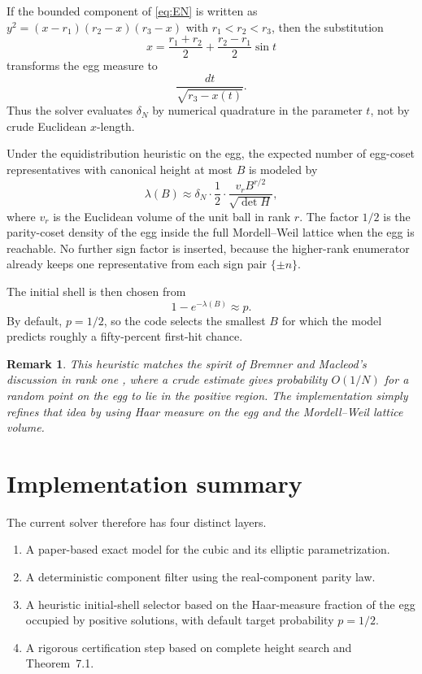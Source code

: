 \documentclass[11pt]{article}
\newtheorem{remark}[theorem]{Remark}
\begin{document}
If the bounded component of \eqref{eq:EN} is written as $y^2=(x-r_1)(r_2-x)(r_3-x)$ with $r_1<r_2<r_3$, then the substitution
\[
x=\frac{r_1+r_2}{2}+\frac{r_2-r_1}{2}\sin t
\]
transforms the egg measure to
\[
\frac{dt}{\sqrt{r_3-x(t)}}.
\]
Thus the solver evaluates $\delta_N$ by numerical quadrature in the parameter $t$, not by crude Euclidean $x$-length.

Under the equidistribution heuristic on the egg, the expected number of egg-coset representatives with canonical height at most $B$ is modeled by
\begin{equation}\label{eq:lambda}
\lambda(B) \approx \delta_N\cdot \frac12\cdot \frac{v_r B^{r/2}}{\sqrt{\det H}},
\end{equation}
where $v_r$ is the Euclidean volume of the unit ball in rank $r$. The factor $1/2$ is the parity-coset density of the egg inside the full Mordell--Weil lattice when the egg is reachable. No further sign factor is inserted, because the higher-rank enumerator already keeps one representative from each sign pair $\{\pm n\}$.

The initial shell is then chosen from
\[
1-e^{-\lambda(B)} \approx p.
\]
By default, $p=1/2$, so the code selects the smallest $B$ for which the model predicts roughly a fifty-percent first-hit chance.

\begin{remark}
This heuristic matches the spirit of Bremner and Macleod's discussion in rank one \cite{BremnerMacleod2014}, where a crude estimate gives probability $O(1/N)$ for a random point on the egg to lie in the positive region. The implementation simply refines that idea by using Haar measure on the egg and the Mordell--Weil lattice volume.
\end{remark}

\section{Implementation summary}
The current solver therefore has four distinct layers.
\begin{enumerate}[label=\arabic*.]
\item A paper-based exact model for the cubic and its elliptic parametrization.
\item A deterministic component filter using the real-component parity law.
\item A heuristic initial-shell selector based on the Haar-measure fraction of the egg occupied by positive solutions, with default target probability $p=1/2$.
\item A rigorous certification step based on complete height search and Theorem~7.1.
\end{enumerate}
\end{document}
